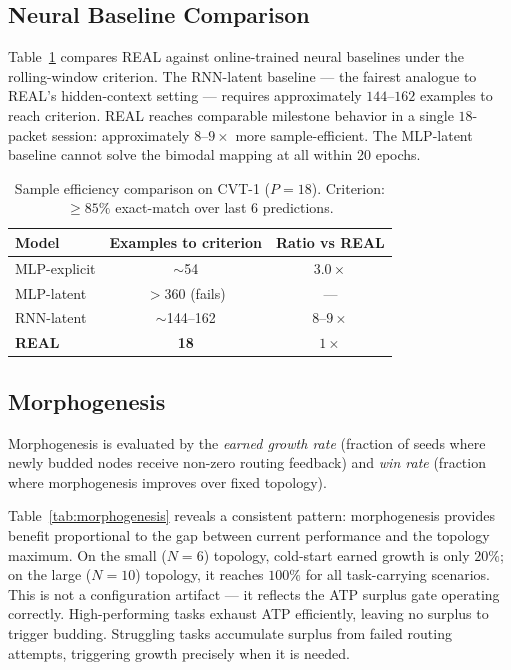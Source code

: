 \documentclass[10pt,twocolumn]{article}
\begin{document}
\subsection{Neural Baseline Comparison}
\label{sec:neural}

Table~\ref{tab:neural} compares REAL against online-trained neural baselines
under the rolling-window criterion.
The RNN-latent baseline --- the fairest analogue to REAL's hidden-context setting
--- requires approximately $144$--$162$ examples to reach criterion.
REAL reaches comparable milestone behavior in a single $18$-packet session:
approximately $8$--$9\times$ more sample-efficient.
The MLP-latent baseline cannot solve the bimodal mapping at all within 20 epochs.

\begin{table}[t]
\centering
\caption{Sample efficiency comparison on CVT-1 ($P=18$).
  Criterion: $\geq\!85\%$ exact-match over last 6 predictions.}
\label{tab:neural}
\small
\begin{tabular}{lcc}
\toprule
Model & Examples to criterion & Ratio vs REAL \\
\midrule
MLP-explicit       & $\sim$54 & $3.0\times$ \\
MLP-latent         & $>$360 (fails) & --- \\
RNN-latent         & $\sim$144--162 & $8$--$9\times$ \\
\midrule
\textbf{REAL}      & \textbf{18} & $1\times$ \\
\bottomrule
\end{tabular}
\end{table}

\subsection{Morphogenesis}
\label{sec:morphogenesis}

Morphogenesis is evaluated by the \emph{earned growth rate}
(fraction of seeds where newly budded nodes receive non-zero routing feedback)
and \emph{win rate} (fraction where morphogenesis improves over fixed topology).

Table~\ref{tab:morphogenesis} reveals a consistent pattern:
morphogenesis provides benefit proportional to the gap between current
performance and the topology maximum.
On the small ($N\!=\!6$) topology, cold-start earned growth is only $20\%$;
on the large ($N\!=\!10$) topology, it reaches $100\%$ for all task-carrying
scenarios.
This is not a configuration artifact --- it reflects the ATP surplus gate
operating correctly.
High-performing tasks exhaust ATP efficiently, leaving no surplus to trigger
budding.
Struggling tasks accumulate surplus from failed routing attempts, triggering
growth precisely when it is needed.
\end{document}
